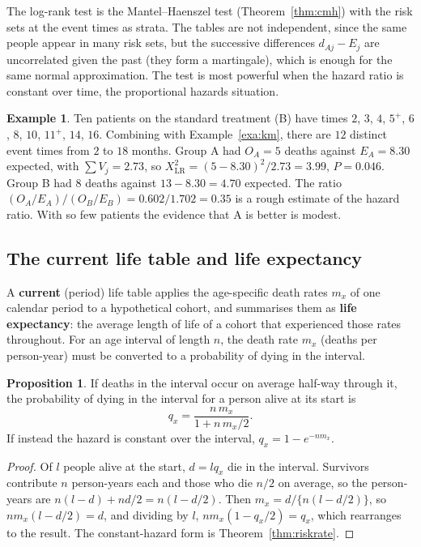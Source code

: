 \documentclass[11pt,a4paper]{article}
\numberwithin{equation}{section}
\theoremstyle{definition}
\newtheorem{exa}[thm]{Example}
\newtheorem{prop}[thm]{Proposition}
\begin{document}
The log-rank test is the Mantel--Haenszel test (Theorem~\ref{thm:cmh}) with the risk sets at the event times as strata. The tables are
not independent, since the same people appear in many risk sets, but the successive differences $d_{Aj} - E_j$ are uncorrelated given the past
(they form a martingale), which is enough for the same normal approximation. The test is most powerful when the hazard ratio is
constant over time, the proportional hazards situation.

\begin{exa}
\label{exa:logrank}
Ten patients on the standard treatment (B) have times $2$, $3$, $4$, $5^+$, $6$, $8$, $10$, $11^+$, $14$, $16$. Combining with Example~\ref{exa:km}, there are $12$ distinct event times
from $2$ to $18$ months. Group A had $O_A = 5$ deaths against $E_A = 8.30$ expected, with $\sum V_j = 2.73$, so $X^2_{\text{LR}} = (5 - 8.30)^2/2.73 = 3.99$, $P = 0.046$. Group B had $8$
deaths against $13 - 8.30 = 4.70$ expected. The ratio $(O_A/E_A)/(O_B/E_B) = 0.602/1.702 = 0.35$ is a rough estimate of the hazard ratio. With so few
patients the evidence that A is better is modest.
\end{exa}

\subsection{The current life table and life expectancy}

A \textbf{current} (period) life table applies the age-specific death rates $m_x$ of one calendar period to a hypothetical cohort, and
summarises them as \textbf{life expectancy}: the average length of life of a cohort that experienced those rates throughout. For an age
interval of length $n$, the death rate $m_x$ (deaths per person-year) must be converted to a probability of dying in the interval.

\begin{prop}
\label{prop:mtoq}
If deaths in the interval occur on average half-way through it, the probability of dying in the interval for a person alive at its
start is
\[
q_x = \frac{n\,m_x}{1 + n\,m_x/2} .
\]
If instead the hazard is constant over the interval, $q_x = 1 - e^{-n m_x}$.
\end{prop}

\begin{proof}
Of $l$ people alive at the start, $d = l q_x$ die in the interval. Survivors contribute $n$ person-years each and those who die $n/2$ on average,
so the person-years are $n(l - d) + nd/2 = n(l - d/2)$. Then $m_x = d/\{n(l - d/2)\}$, so $nm_x(l - d/2) = d$, and dividing by $l$, $nm_x(1 - q_x/2) = q_x$, which
rearranges to the result. The constant-hazard form is Theorem~\ref{thm:riskrate}.
\end{proof}
\end{document}
